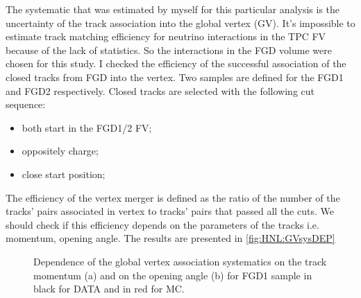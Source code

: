 \documentclass[../main.tex]{subfiles}
\begin{document}
The systematic that was estimated by myself for this particular analysis is the uncertainty of the track association into the global vertex (GV). It's impossible to estimate track matching efficiency for neutrino interactions in the TPC FV because of the lack of statistics. So the interactions in the FGD volume were chosen for this study. I checked the efficiency of the successful association of the closed tracks from FGD into the vertex. Two samples are defined for the FGD1 and FGD2 respectively. Closed tracks are selected with the following cut sequence:
\begin{itemize}
    \item both start in the FGD1/2 FV;
    \item oppositely charge;
    \item close start position;
\end{itemize}
The efficiency of the vertex merger is defined as the ratio of the number of the tracks' pairs associated in vertex to tracks' pairs that passed all the cuts. We should check if this efficiency depends on the parameters of the tracks i.e. momentum, opening angle. The results are presented in \autoref{fig:HNL:GVsysDEP}
\begin{figure}[!ht]
    \begin{minipage}[h]{0.49\linewidth}
    \end{minipage}
    \hfill
    \begin{minipage}[h]{0.49\linewidth}
    \end{minipage}
    \vfill
    \begin{minipage}[h]{0.49\linewidth}
    \end{minipage}
    \hfill
    \begin{minipage}[h]{0.49\linewidth}
    \end{minipage}
    \caption{Dependence of the global vertex association systematics on the  track momentum (a) and on the opening angle (b) for FGD1 sample in black for DATA and in red for MC.}
    \label{fig:HNL:GVsysDEP}
\end{figure}
\end{document}
